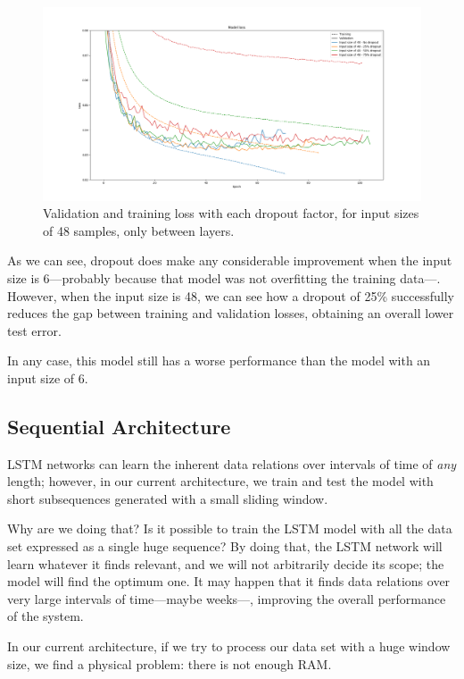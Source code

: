 \documentclass[]{article}
\begin{document}
\begin{figure}[H]
	\centering
	\includegraphics[width=\textwidth]{drop32}
	\caption{Validation and training loss with each dropout factor, for input sizes of 48 samples, only between layers.}
	\label{f:drop32}
\end{figure}

As we can see, dropout does make any considerable improvement when the input size is 6---probably because that model was not overfitting the training data---. However, when the input size is 48, we can see how a dropout of 25\% successfully reduces the gap between training and validation losses, obtaining an overall lower test error.

In any case, this model still has a worse performance than the model with an input size of 6.

\subsection{Sequential Architecture}

LSTM networks can learn the inherent data relations over intervals of time of \emph{any} length; however, in our current architecture, we train and test the model with short subsequences generated with a small sliding window.

Why are we doing that? Is it possible to train the LSTM model with all the data set expressed as a single huge sequence? By doing that, the LSTM network will learn whatever it finds relevant, and we will not arbitrarily decide its scope; the model will find the optimum one. It may happen that it finds data relations over very large intervals of time---maybe weeks---, improving the overall performance of the system.

In our current architecture, if we try to process our data set with a huge window size, we find a physical problem: there is not enough RAM.
\end{document}
